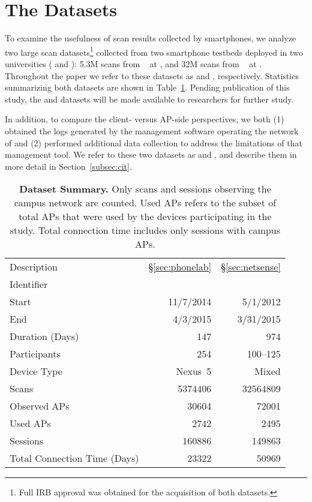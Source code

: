 \section{The Datasets}
\label{sec:dataset}

To examine the usefulness of \wifi{} scan results collected by smartphones, we
analyze two large scan datasets\footnote{Full IRB approval was obtained for the
acquisition of both datasets.} collected from two smartphone testbeds deployed
in two universities (\ub{} and \nd{}): 5.3M scans from
\PhoneLab{}~\cite{nandugudi2013phonelab} at \ub{}, and 32M scans from
\NetSense{}~\cite{striegel2013lessons} at \nd{}.  Throughout the paper we refer
to these datasets as \textbf{\ubscan{}} and \textbf{\ndscan{}}, respectively.
Statistics summarizing both datasets are shown in Table~\ref{tab:stats}. Pending
publication of this study, the \ubscan{} and \ndscan{} datasets will be made
available to researchers for further study.

In addition, to compare the client- versus AP-side perspectives, we
both (1) obtained the logs generated by the management software
operating the \wifi{} network of \ub{} and (2) performed additional data collection
to address the limitations of that management tool. We refer to these two
datasets as \textbf{\ubap{}} and \textbf{\ubapdetail{}}, and describe them in
more detail in Section~\ref{subsec:cit}.

\begin{table}[t]
  {\small
  \begin{tabularx}{\columnwidth}{Xrr}
    & \PhoneLab{} & \NetSense{}\\\midrule
    Description & \S\ref{sec:phonelab} & \S\ref{sec:netsense} \\
    Identifier & \ubscan{} & \ndscan{} \\ 
    Start & 11/7/2014 & 5/1/2012 \\ 
    End & 4/3/2015 & 3/31/2015 \\ 
    Duration (Days) & 147 & 974 \\ \midrule
    Participants & 254 & 100--125 \\
    Device Type & Nexus~5 & Mixed \\ \midrule
    Scans & \num{5374406} & \num{32564809} \\
    Observed APs & \num{30604} & \num{72001} \\
    Used APs & \num{2742} & \num{2495}\\ \midrule
    \wifi{} Sessions & \num{160886} & \num{149863} \\
    Total Connection Time (Days) & \num{23322} & \num{50969} 
  \end{tabularx}
  \caption{\textbf{Dataset Summary.} Only \wifi{} scans and sessions
  observing the campus network are counted. Used APs refers to the subset of
  total APs that were used by the devices participating in the study. Total
connection time includes only \wifi{} sessions with campus APs.}
  \label{tab:stats}
  \vspace*{-5mm}
}
\end{table}


